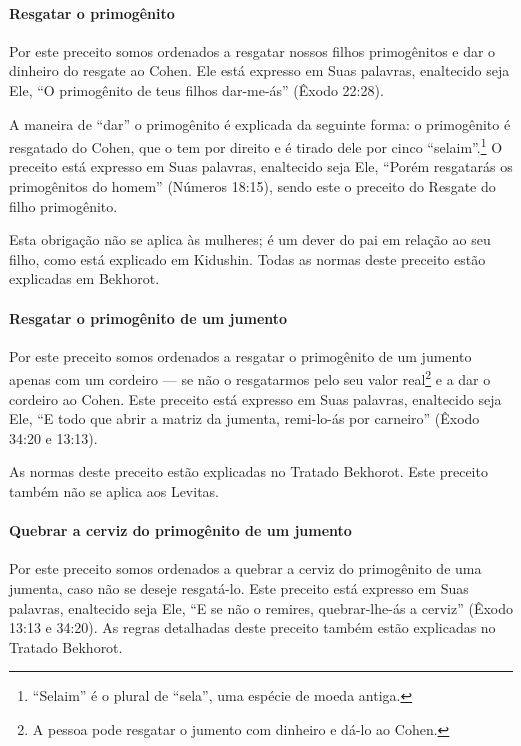 \paragraph{Resgatar o primogênito}

Por este preceito somos ordenados a resgatar nossos filhos primogênitos
e dar o dinheiro do resgate ao Cohen. Ele está expresso em Suas
palavras, enaltecido seja Ele, ``O primogênito de teus filhos dar-me-ás'' (Êxodo 22:28).

A maneira de ``dar'' o primogênito é explicada da seguinte forma: o
primogênito é resgatado do Cohen, que o tem por direito e é tirado
dele por cinco ``selaim''.\footnote{``Selaim'' é o plural de ``sela'', uma espécie de moeda antiga.} O preceito está expresso em Suas palavras, enaltecido seja Ele, ``Porém
resgatarás os primogênitos do homem'' (Números 18:15), sendo este o
preceito do Resgate do filho primogênito.

Esta obrigação não se aplica às mulheres; é um dever do pai em relação
ao seu filho, como está explicado em Kidushin. Todas as normas deste
preceito estão explicadas em Bekhorot.

\paragraph{Resgatar o primogênito de um jumento}

Por este preceito somos ordenados a resgatar o primogênito de um jumento
apenas com um cordeiro --- se não o resgatarmos pelo seu valor
real\footnote{A pessoa pode resgatar o jumento com dinheiro e dá-lo ao Cohen.} e a dar o cordeiro ao Cohen. Este
preceito está expresso em Suas palavras,
enaltecido seja Ele, ``E todo que abrir a matriz da jumenta, remi-lo-ás
por carneiro'' (Êxodo 34:20 e 13:13).

As normas deste preceito estão explicadas no Tratado Bekhorot. Este
preceito também não se aplica aos Levitas.

\paragraph{Quebrar a cerviz do primogênito de um jumento}

Por este preceito somos ordenados a quebrar a cerviz do primogênito de
uma jumenta, caso não se deseje resgatá-lo. Este preceito está expresso
em Suas palavras, enaltecido seja Ele, ``E se não o remires,
quebrar-lhe-ás a cerviz'' (Êxodo 13:13 e 34:20). As regras detalhadas
deste preceito também estão explicadas no Tratado Bekhorot.

